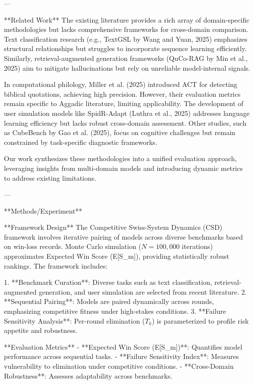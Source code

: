---

**Related Work**  
The existing literature provides a rich array of domain-specific methodologies but lacks comprehensive frameworks for cross-domain comparison. Text classification research (e.g., TextGSL by Wang and Yuan, 2025) emphasizes structural relationships but struggles to incorporate sequence learning efficiently. Similarly, retrieval-augmented generation frameworks (QuCo-RAG by Min et al., 2025) aim to mitigate hallucinations but rely on unreliable model-internal signals.  

In computational philology, Miller et al. (2025) introduced ACT for detecting biblical quotations, achieving high precision. However, their evaluation metrics remain specific to Aggadic literature, limiting applicability. The development of user simulation models like SpidR-Adapt (Luthra et al., 2025) addresses language learning efficiency but lacks robust cross-domain assessment. Other studies, such as CubeBench by Gao et al. (2025), focus on cognitive challenges but remain constrained by task-specific diagnostic frameworks.  

Our work synthesizes these methodologies into a unified evaluation approach, leveraging insights from multi-domain models and introducing dynamic metrics to address existing limitations.  

---

**Methods/Experiment**  

**Framework Design**  
The Competitive Swiss-System Dynamics (CSD) framework involves iterative pairing of models across diverse benchmarks based on win-loss records. Monte Carlo simulation ($N=100,000$ iterations) approximates Expected Win Score (E[S_m]), providing statistically robust rankings. The framework includes:  

1. **Benchmark Curation**: Diverse tasks such as text classification, retrieval-augmented generation, and user simulation are selected from recent literature.  
2. **Sequential Pairing**: Models are paired dynamically across rounds, emphasizing competitive fitness under high-stakes conditions.  
3. **Failure Sensitivity Analysis**: Per-round elimination ($T_k$) is parameterized to profile risk appetite and robustness.  

**Evaluation Metrics**  
- **Expected Win Score (E[S_m])**: Quantifies model performance across sequential tasks.  
- **Failure Sensitivity Index**: Measures vulnerability to elimination under competitive conditions.  
- **Cross-Domain Robustness**: Assesses adaptability across benchmarks.  

